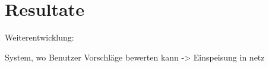 \chapter{Resultate}
\label{ch:results}


Weiterentwicklung:

System, wo Benutzer Vorschläge bewerten kann -> Einspeisung in netz